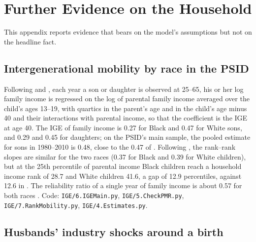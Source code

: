 \section{Further Evidence on the Household}\label{app:other}

This appendix reports evidence that bears on the model's assumptions but not on the headline fact.

\subsection{Intergenerational mobility by race in the PSID}\label{sec:measurement}

Following \citet{lee2009trends} and \citet{palomino2018one}, each year a son or daughter is observed at 25--65, his or
her log family income is regressed on the log of parental family income averaged over the child's ages 13--19, with
quartics in the parent's age and in the child's age minus 40 and their interactions with parental income, so that the
coefficient is the IGE at age 40. The IGE of family income is 0.27 for Black and 0.47 for White sons, and 0.29 and 0.45
for daughters; on the PSID's main sample, the pooled estimate for sons in 1980--2010 is 0.48, close to the 0.47 of
\citet{palomino2018one}. Following \citet{chetty2020race}, the rank--rank slopes are similar for the two races (0.37 for
Black and 0.39 for White children), but at the 25th percentile of parental income Black children reach a household
income rank of 28.7 and White children 41.6, a gap of 12.9 percentiles, against 12.6 in \citet{chetty2020race}. The
reliability ratio of a single year of family income is about 0.57 for both races \citep{bolt2024intergenerational}.
Code: \texttt{IGE/6.IGEMain.py}, \texttt{IGE/5.CheckPMR.py}, \texttt{IGE/7.RankMobility.py}, \texttt{IGE/4.Estimates.py}.

\subsection{Husbands' industry shocks around a birth}\label{sec:birthshocks}


